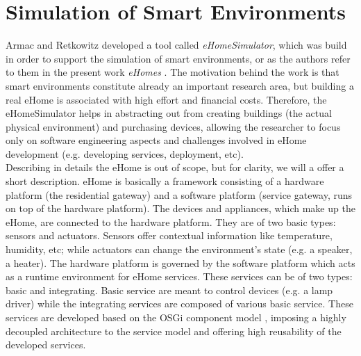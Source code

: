 \section{Simulation of Smart Environments}\label{sec:sim_of_smart_envs}

Armac and Retkowitz developed a tool called \emph{eHomeSimulator}, which was build in order to support the simulation of smart environments, or as the authors refer to them in the present work \emph{eHomes} \cite{armac2007simulation}. The motivation behind the work is that smart environments constitute already an important research area, but building a real eHome is associated with high effort and financial costs. Therefore, the eHomeSimulator helps in abstracting out from creating buildings (the actual physical environment) and purchasing devices, allowing the researcher to focus only on software engineering aspects and challenges involved in eHome development (e.g. developing services, deployment, etc).\\

Describing in details the eHome is out of scope, but for clarity, we will a offer a short description. eHome is basically a framework consisting of a hardware platform (the residential gateway) and a software platform (service gateway, runs on top of the hardware platform). The devices and appliances, which make up the eHome, are connected to the hardware platform. They are of two basic types: sensors and actuators. Sensors offer contextual information like temperature, humidity, etc; while actuators can change the environment's state (e.g. a speaker, a heater). The hardware platform is governed by the software platform which acts as a runtime environment for eHome services. These services can be of two types: basic and integrating. Basic service are meant to control devices (e.g. a lamp driver) while the integrating services are composed of various basic service. These services are developed based on the OSGi component model \cite{allianceosgi}, imposing a highly decoupled architecture to the service model and offering high reusability of the developed services.\\

